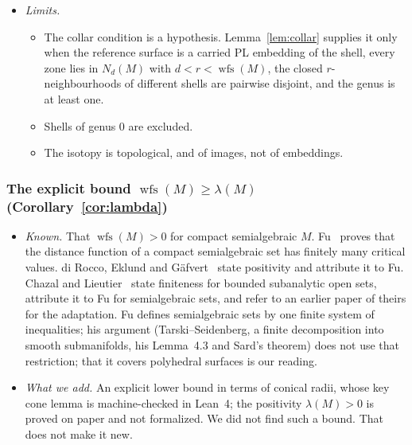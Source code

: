 \documentclass[preprint,12pt]{elsarticle}
\theoremstyle{definition}
\theoremstyle{remark}
\newcommand{\wfs}{\operatorname{wfs}}
\begin{document}
\begin{itemize}
\begin{itemize}
  \end{itemize}
\item \emph{Limits.}
  \begin{itemize}
  \item The collar condition is a hypothesis. Lemma~\ref{lem:collar} supplies it only when the reference surface is a
  carried PL embedding of the shell, every zone lies in $N_d(M)$ with $d<r<\wfs(M)$, the closed $r$-neighbourhoods of
  different shells are pairwise disjoint, and the genus is at least one.
  \item Shells of genus $0$ are excluded.
  \item The isotopy is topological, and of images, not of embeddings.
  \end{itemize}
\end{itemize}

\subsubsection*{The explicit bound $\wfs(M)\ge\lambda(M)$ (Corollary~\ref{cor:lambda})}
\begin{itemize}
\item \emph{Known.} That $\wfs(M)>0$ for compact semialgebraic $M$. Fu~\cite[\S5.3]{Fu85}
proves that the distance function of a compact semialgebraic set has finitely many critical values. di Rocco, Eklund and
Gäfvert~\cite[Thm.~2.5]{dREG22} state positivity and attribute it to Fu. Chazal and
Lieutier~\cite[Prop.~3.6]{ChazalLieutier07} state finiteness for bounded subanalytic open sets, attribute it to Fu for
semialgebraic sets, and refer to an earlier paper of theirs for the adaptation. Fu defines semialgebraic sets by one
finite system of inequalities; his argument (Tarski--Seidenberg, a finite decomposition into smooth submanifolds, his
Lemma~4.3 and Sard's theorem) does not use that restriction; that it covers polyhedral surfaces is our reading.
\item \emph{What we add.} An explicit lower bound in terms of conical radii, whose key cone lemma is machine-checked in
Lean~4; the positivity $\lambda(M)>0$ is proved on paper and not formalized. We did not find such a bound. That does not
make it new.
\end{itemize}
\end{document}
